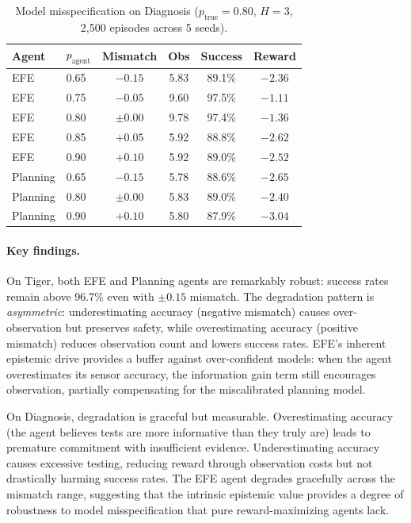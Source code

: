 \documentclass[runningheads]{llncs}
\begin{document}
\begin{table}[h]
\centering
\caption{Model misspecification on Diagnosis ($p_{\text{true}}{=}0.80$, $H{=}3$, 2{,}500 episodes across 5 seeds).}
\label{tab:misspec-diag}
\begin{small}
\begin{tabular}{llcccc}
\toprule
Agent & $p_{\text{agent}}$ & Mismatch & Obs & Success & Reward \\
\midrule
EFE & 0.65 & $-0.15$ & 5.83 & 89.1\% & $-2.36$ \\
EFE & 0.75 & $-0.05$ & 9.60 & 97.5\% & $-1.11$ \\
EFE & 0.80 & $\pm 0.00$ & 9.78 & 97.4\% & $-1.36$ \\
EFE & 0.85 & $+0.05$ & 5.92 & 88.8\% & $-2.62$ \\
EFE & 0.90 & $+0.10$ & 5.92 & 89.0\% & $-2.52$ \\
\midrule
Planning & 0.65 & $-0.15$ & 5.78 & 88.6\% & $-2.65$ \\
Planning & 0.80 & $\pm 0.00$ & 5.83 & 89.0\% & $-2.40$ \\
Planning & 0.90 & $+0.10$ & 5.80 & 87.9\% & $-3.04$ \\
\bottomrule
\end{tabular}
\end{small}
\end{table}

\paragraph{Key findings.} On Tiger, both EFE and Planning agents are remarkably robust: success rates remain above 96.7\% even with $\pm 0.15$ mismatch. The degradation pattern is \emph{asymmetric}: underestimating accuracy (negative mismatch) causes over-observation but preserves safety, while overestimating accuracy (positive mismatch) reduces observation count and lowers success rates. EFE's inherent epistemic drive provides a buffer against over-confident models: when the agent overestimates its sensor accuracy, the information gain term still encourages observation, partially compensating for the miscalibrated planning model.

On Diagnosis, degradation is graceful but measurable. Overestimating accuracy (the agent believes tests are more informative than they truly are) leads to premature commitment with insufficient evidence. Underestimating accuracy causes excessive testing, reducing reward through observation costs but not drastically harming success rates. The EFE agent degrades gracefully across the mismatch range, suggesting that the intrinsic epistemic value provides a degree of robustness to model misspecification that pure reward-maximizing agents lack.
\end{document}
